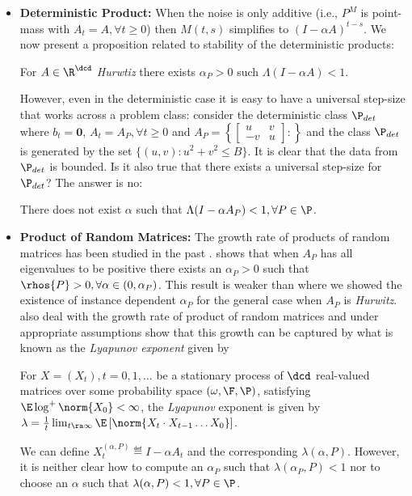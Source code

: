  \begin{itemize}[leftmargin=*]
 \item \textbf{Deterministic Product:} When the noise is only additive (i.e., $P^M$ is point-mass with $A_t=A,\forall t\geq 0$) then $M(t,s)$ simplifies to $(I-\alpha A)^{t-s}$. We now present a proposition related to stability of the deterministic products:
 \begin{proposition}\label{prop:stabhur}
For $A\in \R^{\dcd}$ \emph{Hurwtiz} there exists $\alpha_P>0$ such $\Lambda(I-\alpha A)<1$.
\end{proposition}
 However, even in the deterministic case it is easy to have a universal step-size that works across a problem class: consider the deterministic class $\P_{det}$ where $b_t=\mathbf{0}$, $A_t=A_P, \forall t\geq 0$ and $A_P=\left\{\left[\begin{matrix} u &v \\ -v & u\end{matrix}\right] : \right\}$ and the class $\P_{det}$ is generated by the set $\{(u,v) : u^2+v^2\leq B\}$. It is clear that the data from $\P_{det}$ is bounded. Is it also true that there exists a universal step-size for $\P_{det}$? The answer is no:  \begin{proposition}\label{prop:unistep}
There does not exist $\alpha$ such that $\Lambda(I-\alpha A_P)<1, \forall P\in \P$. 
\end{proposition}
 \item \textbf{Product of Random Matrices:}  The growth rate of products of random matrices has been studied in the past \cite{meyn,logexp}. \citet{meyn} shows that when $A_P$ has all eigenvalues to be positive there exists an $\alpha_P>0$ such that $\rhos{P}>0, \forall \alpha\in(0,\alpha_P)$. This result is weaker than  where we showed the existence of instance dependent $\alpha_P$ for the general case when $A_P$ is \emph{Hurwitz}. \citet{kesten,logexp} also deal with the growth rate of product of random matrices and under appropriate assumptions show that this growth can be captured by what is known as the \emph{Lyapunov exponent} given by
\begin{definition}\label{ex:lyap}
For $X=(X_t),t=0,1,\ldots$ be a stationary process of $\dcd$ real-valued matrices over some probability space $(\omega, \F,\P)$, satisfying $\E \log^+ \norm{X_0}<\infty$, the \emph{Lyapunov} exponent is given by $\lambda=\frac{1}{t}\lim_{t\ra\infty} \E\left[ \norm{X_t\cdot X_{t-1}\ldots X_0}\right]$.
 \end{definition}
We can define $X^(\alpha,P)_t\eqdef I-\alpha A_t$ and the corresponding  $\lambda(\alpha,P)$.  However, it is neither clear how to compute an $\alpha_P$ such that $\lambda(\alpha_P,P)<1$ nor to choose an $\alpha$ such that $\lambda(\alpha,P)<1, \forall P\in \P$. 
 \end{itemize}

